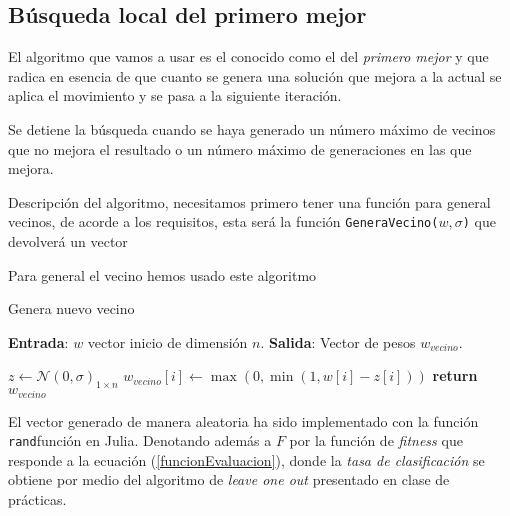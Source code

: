 \subsection{Búsqueda local del primero mejor}  
\label{primero-mejor}
El algoritmo que vamos a usar es el conocido como el del \textit{primero mejor} y que radica en esencia de que  cuanto se genera 
una solución que mejora a la actual se aplica el movimiento y se pasa a la siguiente iteración.

Se detiene la búsqueda cuando se haya generado un número máximo de vecinos que no mejora el resultado
o un número máximo de generaciones en las que mejora.

Descripción del algoritmo, necesitamos primero tener una función para general vecinos, de acorde a los requisitos, esta será 
la función \texttt{GeneraVecino($w,\sigma$)} que devolverá un vector 


  Para general el vecino hemos usado este algoritmo 

  \begin{algorithm}[H]
    \caption{Genera nuevo vecino}
    \hspace*{\algorithmicindent} 

        \textbf{Entrada}: $w$ vector inicio de dimensión $n$. 
        \hspace*{\algorithmicindent} 
        \textbf{Salida}:
        Vector de pesos $w_{vecino}$.        
    \begin{algorithmic}[1]
          $z \gets \mathcal{N}(0, \sigma)_{1 \times n}$
        \EndIf
          \State $w_{vecino}[i] \gets \max(0, \min(1, w[i]-z[i]))$
        \EndFor
        \State \textbf{return} $w_{vecino}$
      \EndProcedure
    \end{algorithmic}
  \end{algorithm}

El vector generado de manera aleatoria ha sido implementado con la función \texttt{rand}función en Julia.  
Denotando además a $F$ por la 
función de \textit{fitness} que responde a la ecuación 
(\ref{funcionEvaluacion}), 
donde la \textit{tasa de clasificación} se obtiene por medio del algoritmo de 
\textit{leave one out} presentado en clase de prácticas.

